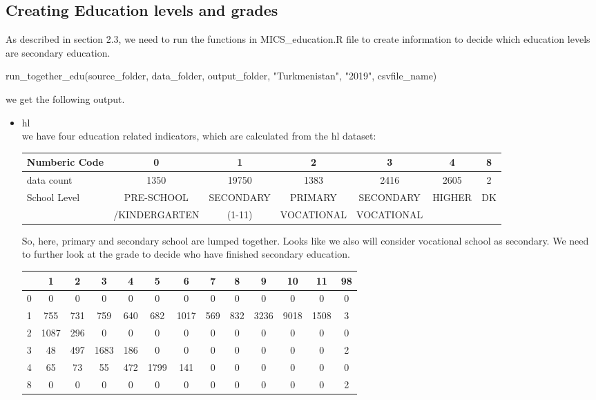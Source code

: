 \documentclass[12pt]{article}
\begin{document}
\subsection{Creating Education levels and grades}
As described in section 2.3, we need to run the functions in MICS\_education.R file to create information to decide which education levels are secondary education. 

run\_together\_edu(source\_folder, data\_folder, output\_folder, "Turkmenistan", "2019",  csvfile\_name)

we get the following output.
\begin{itemize}
	\item hl \\
      we have four education related indicators, which are calculated from the hl dataset:
      
		{\small
		\begin{tabular}{l|c|c|c|c|c|c|}
		\hline 
			Numberic Code & 0 & 1 & 2 & 3 & 4 & 8 \\
		\hline
			data count & 1350 & 19750 & 1383 & 2416 & 2605 & 2 \\
		\hline
			School Level & PRE-SCHOOL & SECONDARY  & PRIMARY& SECONDARY & HIGHER & DK \\ 
			 &/KINDERGARTEN & (1-11) &VOCATIONAL &VOCATIONAL & & \\ 			
		\hline                                       
		\end{tabular}
	}

So, here, primary and secondary school are lumped together. Looks like we also will consider vocational school as secondary.
We need to further look at the grade to decide who have finished secondary education.

		{\small
	\begin{tabular}{l|c|c|c|c|c|c|c|c|c|c|c|c|}
		\hline
	  & 1 & 2 & 3 & 4 & 5 & 6 & 7 & 8 & 9 & 10 & 11 & 98 \\
	  \hline
	0 & 0 & 0 & 0 & 0 & 0 & 0 & 0 & 0 & 0 & 0 & 0 & 0 \\
	1 & 755 & 731 & 759 & 640 & 682 & 1017 & 569 & 832 & 3236 & 9018 & 1508 & 3 \\
	2 & 1087 & 296 & 0 & 0 & 0 & 0 & 0 & 0 & 0 & 0 & 0 & 0 \\
	3 & 48 & 497 & 1683 & 186 & 0 & 0 & 0 & 0 & 0 & 0 & 0 & 2 \\
	4 & 65 & 73 & 55 & 472 & 1799 & 141 & 0 & 0 & 0 & 0 & 0 & 0 \\
	8 & 0 & 0 & 0 & 0 & 0 & 0 & 0 & 0 & 0 & 0 & 0 & 2 \\
	\hline
		\end{tabular}
}


\end{itemize}
\end{document}
